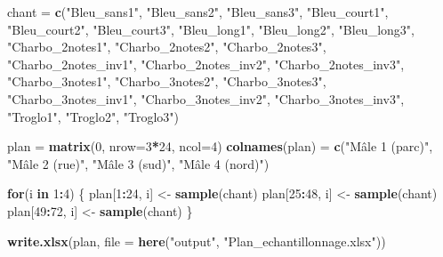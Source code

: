\documentclass[
  french,
]{article}
\newenvironment{Shaded}{\begin{snugshade}}{\end{snugshade}}
\newcommand{\AttributeTok}[1]{\textcolor[rgb]{0.13,0.29,0.53}{#1}}
\newcommand{\ControlFlowTok}[1]{\textcolor[rgb]{0.13,0.29,0.53}{\textbf{#1}}}
\newcommand{\DecValTok}[1]{\textcolor[rgb]{0.00,0.00,0.81}{#1}}
\newcommand{\FunctionTok}[1]{\textcolor[rgb]{0.13,0.29,0.53}{\textbf{#1}}}
\newcommand{\NormalTok}[1]{#1}
\newcommand{\OtherTok}[1]{\textcolor[rgb]{0.56,0.35,0.01}{#1}}
\newcommand{\SpecialCharTok}[1]{\textcolor[rgb]{0.81,0.36,0.00}{\textbf{#1}}}
\newcommand{\StringTok}[1]{\textcolor[rgb]{0.31,0.60,0.02}{#1}}
\begin{document}
\begin{Shaded}
\begin{Highlighting}[]
\NormalTok{chant }\OtherTok{=} \FunctionTok{c}\NormalTok{(}\StringTok{"Bleu\_sans1"}\NormalTok{, }\StringTok{"Bleu\_sans2"}\NormalTok{, }\StringTok{"Bleu\_sans3"}\NormalTok{, }\StringTok{"Bleu\_court1"}\NormalTok{, }\StringTok{"Bleu\_court2"}\NormalTok{, }\StringTok{"Bleu\_court3"}\NormalTok{, }\StringTok{"Bleu\_long1"}\NormalTok{, }\StringTok{"Bleu\_long2"}\NormalTok{, }\StringTok{"Bleu\_long3"}\NormalTok{, }\StringTok{"Charbo\_2notes1"}\NormalTok{, }\StringTok{"Charbo\_2notes2"}\NormalTok{, }\StringTok{"Charbo\_2notes3"}\NormalTok{, }\StringTok{"Charbo\_2notes\_inv1"}\NormalTok{, }\StringTok{"Charbo\_2notes\_inv2"}\NormalTok{, }\StringTok{"Charbo\_2notes\_inv3"}\NormalTok{, }\StringTok{"Charbo\_3notes1"}\NormalTok{, }\StringTok{"Charbo\_3notes2"}\NormalTok{, }\StringTok{"Charbo\_3notes3"}\NormalTok{, }\StringTok{"Charbo\_3notes\_inv1"}\NormalTok{, }\StringTok{"Charbo\_3notes\_inv2"}\NormalTok{, }\StringTok{"Charbo\_3notes\_inv3"}\NormalTok{, }\StringTok{"Troglo1"}\NormalTok{, }\StringTok{"Troglo2"}\NormalTok{, }\StringTok{"Troglo3"}\NormalTok{)}

\NormalTok{plan }\OtherTok{=} \FunctionTok{matrix}\NormalTok{(}\DecValTok{0}\NormalTok{, }\AttributeTok{nrow=}\DecValTok{3}\SpecialCharTok{*}\DecValTok{24}\NormalTok{, }\AttributeTok{ncol=}\DecValTok{4}\NormalTok{)}
\FunctionTok{colnames}\NormalTok{(plan) }\OtherTok{=} \FunctionTok{c}\NormalTok{(}\StringTok{"Mâle 1 (parc)"}\NormalTok{, }\StringTok{"Mâle 2 (rue)"}\NormalTok{, }\StringTok{"Mâle 3 (sud)"}\NormalTok{, }\StringTok{"Mâle 4 (nord)"}\NormalTok{)}
  
\ControlFlowTok{for}\NormalTok{(i }\ControlFlowTok{in} \DecValTok{1}\SpecialCharTok{:}\DecValTok{4}\NormalTok{) \{}
\NormalTok{  plan[}\DecValTok{1}\SpecialCharTok{:}\DecValTok{24}\NormalTok{, i] }\OtherTok{\textless{}{-}} \FunctionTok{sample}\NormalTok{(chant)}
\NormalTok{  plan[}\DecValTok{25}\SpecialCharTok{:}\DecValTok{48}\NormalTok{, i] }\OtherTok{\textless{}{-}} \FunctionTok{sample}\NormalTok{(chant)}
\NormalTok{  plan[}\DecValTok{49}\SpecialCharTok{:}\DecValTok{72}\NormalTok{, i] }\OtherTok{\textless{}{-}} \FunctionTok{sample}\NormalTok{(chant)}
\NormalTok{\} }

\FunctionTok{write.xlsx}\NormalTok{(plan, }\AttributeTok{file =} \FunctionTok{here}\NormalTok{(}\StringTok{"output"}\NormalTok{, }\StringTok{"Plan\_echantillonnage.xlsx"}\NormalTok{))}
\end{Highlighting}
\end{Shaded}
\end{document}
